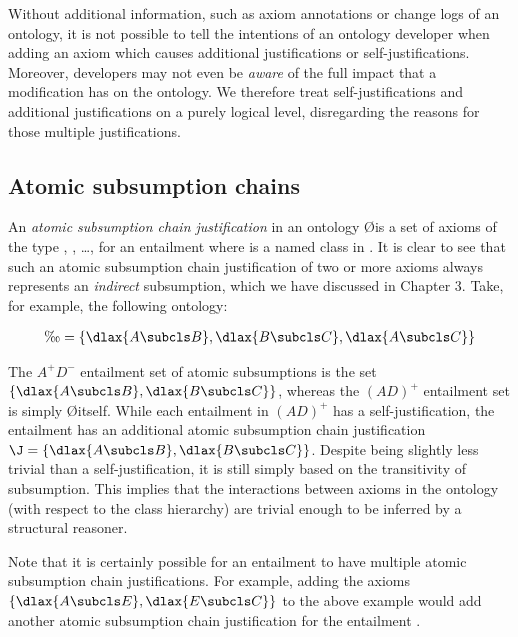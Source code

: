 Without additional information, such as axiom annotations or change logs of an ontology, it is not possible to tell the intentions of an ontology developer when adding an axiom which causes additional justifications or self-justifications. Moreover, developers may not even be \emph{aware} of the full impact that a modification has on the ontology. We therefore treat self-justifications and additional justifications on a purely logical level, disregarding the reasons for those multiple justifications.


\subsection{Atomic subsumption chains}

An \emph{atomic subsumption chain justification} in an ontology \O is a set of axioms of the type ,  , \ldots,   for an entailment  where  is a named class in \sig{\O}. It is clear to see that such an atomic subsumption chain justification of two or more axioms always represents an \emph{indirect} subsumption, which we have discussed in Chapter 3. Take, for example, the following ontology:
\begin{examp}
\begin{align*}
\O = \{ \dlax{A \subcls B}, \dlax{B \subcls C}, \dlax{A \subcls C} \}
\end{align*}
\end{examp}
The $A^{+}D^{-}$ entailment set of atomic subsumptions is the set $\{\dlax{A \subcls B}, \dlax{B \subcls C} \}$, whereas the  $(AD)^{+}$ entailment set is simply \O itself. While each entailment in $(AD)^{+}$ has a self-justification, the entailment  has an additional atomic subsumption chain justification $\J=\{ \dlax{A \subcls B}, \dlax{B \subcls C} \}$. Despite \J being slightly less trivial than a self-justification, it is still simply based on the transitivity of subsumption. This implies that the interactions between axioms in the ontology (with respect to the class hierarchy) are trivial enough to be inferred by a structural reasoner.

Note that it is certainly possible for an entailment to have multiple atomic subsumption chain justifications. For example, adding the axioms $\{\dlax{A \subcls E}, \dlax{E \subcls C} \}$ to the above example would add another atomic subsumption chain justification for the entailment . 

